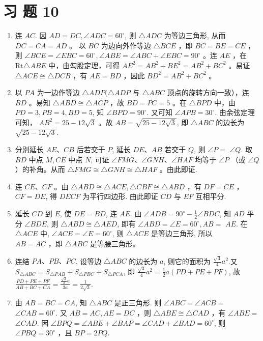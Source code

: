 \documentclass[10pt]{article}
\begin{document}
\section*{习 题 10}
\begin{enumerate}
  \item 连 $A C$. 因 $A D=D C, \angle A D C=60^{\circ}$, 则 $\triangle A D C$ 为等边三角形, 从而 $D C=C A=A D$ 。 以 $B C$ 为边向外作等边 $\triangle B C E$ ，即 $B C=B E=C E$ ，则 $\angle B C E=\angle E B C=60^{\circ}, \angle A B E=\angle A B C+\angle E B C=90^{\circ}$ 。连 $A E$ ，在 $\mathrm{Rt} \triangle A B E$ 中，由勾股定理，可得 $A E^{2}=A B^{2}+B E^{2}=A B^{2}+B C^{2}$ 。易证 $\triangle A C E \cong \triangle D C B$ ，有 $A E=B D$ ，因此 $B D^{2}=A B^{2}+B C^{2}$ 。
  \item 以 $P A$ 为一边作等边 $\triangle A D P(\triangle A D P$ 与 $\triangle A B C$ 顶点的旋转方向一致），连 $B D$ 。易知 $\triangle A B D \cong \triangle A C P$ ，故 $B D=P C=5$ 。在 $\triangle B P D$ 中，由 $P D=3, P B=4, B D=5$, 知 $\angle B P D=90^{\circ}$. 又可知 $\angle A P B=30^{\circ}$. 由余弦定理可知， $A B^{2}=25-12 \sqrt{3}$ 。故 $A B=\sqrt{25-12 \sqrt{3}}$, 即 $\triangle A B C$ 的边长为 $\sqrt{25-12 \sqrt{3}}$.
  \item 分别延长 $A E 、 C B$ 后若交于 $P$, 延长 $D E 、 A B$ 若交于 $Q$, 则 $\angle P=$ $\angle Q$. 取 $B D$ 中点 $M, C E$ 中点 $N$, 可证 $\angle F M G 、 \angle G N H 、 \angle H A F$ 均等于 $\angle P$ （或 $\angle Q$ ）的补角。从而 $\triangle F M G \cong \triangle G N H \cong \triangle H A F$ 。由此即证.
  \item 连 $C E 、 C F$ 。由 $\triangle A B D \cong \triangle A C E, \triangle C B F \cong \triangle A B D$ ，有 $D F=C E$ ， $C F=D E$, 得 $D E C F$ 为平行四边形. 由此即证 $C D$ 与 $E F$ 互相平分.
  \item 延长 $C D$ 到 $E$, 使 $D E=B D$, 连 $A E$. 由 $\angle A D B=90^{\circ}-\frac{1}{2} \angle B D C$, 知 $A D$ 平分 $\angle B D E$, 则 $\triangle A B D \cong \triangle A E D$, 即有 $\angle A B D=\angle E=60^{\circ}, A B=$ $A E$. 在 $\triangle A C E$ 中, $\angle A C E=\angle E=60^{\circ}$, 则 $\triangle A C E$ 是等边三角形, 所以\\
$A B=A C$ ，即 $\triangle A B C$ 是等腰三角形。
  \item 连结 $P A 、 P B 、 P C$, 设等边 $\triangle A B C$ 的边长为 $a$, 则它的面积为 $\frac{\sqrt{3}}{4} a^{2}$.又 $S_{\triangle A B C}=S_{\triangle P A B}+S_{\triangle P B C}+S_{\triangle P C A}$, 即 $\frac{\sqrt{3}}{4} a^{2}=\frac{1}{2} a(P D+P E+P F)$, 故 $\frac{P D+P E+P F}{A B+B C+C A}=\frac{\frac{\sqrt{3}}{2} a}{3 a}=\frac{1}{2 \sqrt{3}}$.
  \item 由 $A B=B C=C A$, 知 $\triangle A B C$ 是正三角形. 则 $\angle A B C=\angle A C B=$ $\angle C A B=60^{\circ}$. 又 $A B=A C, A E=D C$ ，则 $\triangle A B E \cong \triangle C A D$ ，有 $\angle A B E=$ $\angle C A D$. 因 $\angle B P Q=\angle A B E+\angle B A P=\angle C A D+\angle B A D=60^{\circ}$, 则 $\angle P B Q=30^{\circ}$ ，且 $B P=2 P Q$.
\end{enumerate}
\end{document}
